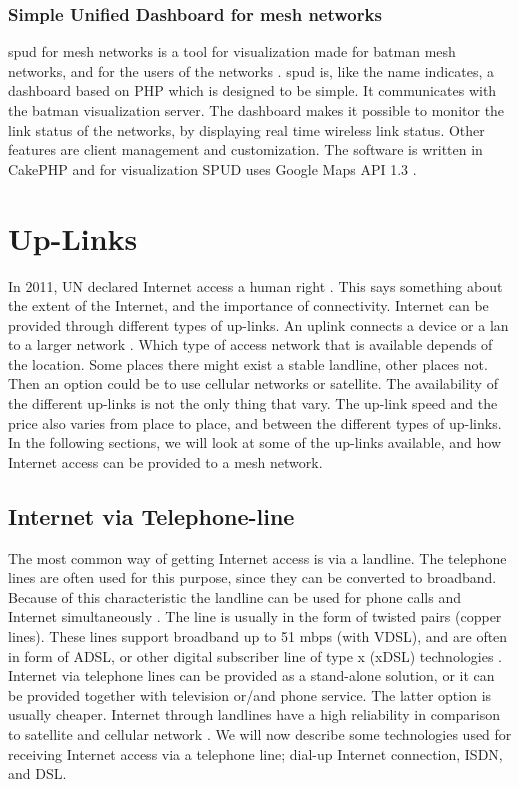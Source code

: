 \subsubsection{Simple Unified Dashboard for mesh networks}
\gls{spud} for mesh networks is a tool for visualization made for \gls{batman} mesh networks, and for the users of the networks \cite{spud}. \gls{spud} is, like the name indicates, a dashboard based on PHP which is designed to be simple. It communicates with the \gls{batman} visualization server. The dashboard makes it possible to monitor the link status of the networks, by displaying real time wireless link status. Other features are client management and customization. The software is written in CakePHP and for visualization SPUD uses Google Maps API 1.3 \cite{spud}.

\section{Up-Links}
In 2011, UN declared Internet access a human right \cite{HR}. This says something about the extent of the Internet, and the importance of connectivity. Internet can be provided through different types of up-links. An uplink connects a device or a \gls{lan} to a larger network \cite{uplink}. Which type of access network that is available depends of the location. Some places there might exist a stable landline, other places not. Then an option could be to use cellular networks or satellite. The availability of the different up-links is not the only thing that vary. The up-link speed and the price also varies from place to place, and between the different types of up-links. In the following sections, we will look at some of the up-links available, and how Internet access can be provided to a mesh network.

\subsection{Internet via Telephone-line}
The most common way of getting Internet access is via a landline. The telephone lines are often used for this purpose, since they can be converted to broadband. Because of this characteristic the landline can be used for phone calls and Internet simultaneously \cite{internet}. The line is usually in the form of twisted pairs (copper lines). These lines support broadband up to 51 \gls{mbps} (with VDSL), and are often in form of ADSL, or other digital subscriber line of type x (xDSL) technologies \cite{audestad}. Internet via telephone lines can be provided as a stand-alone solution, or it can be provided together with television or/and phone service. The latter option is usually cheaper. Internet through landlines have a high reliability in comparison to satellite and cellular network \cite{cablevssatellite}. We will now describe some technologies used for receiving Internet access via a telephone line; dial-up Internet connection, ISDN, and DSL. 

